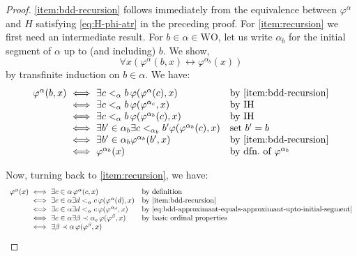 \documentclass[10pt,a4paper]{amsart}
\theoremstyle{plain}
\theoremstyle{definition}
\renewcommand{\phi}{\varphi}
\newcommand{\blue}[1]{{\color{blue}#1}}
\newcommand{\comment}[1]{\blue{#1}}
\newcommand{\anupam}[1]{\todo[color=green]{A: #1}}
\renewcommand{\todo}[1]{}
\renewcommand{\comment}[1]{}
\renewcommand{\anupam}[1]{}
\theoremstyle{plain}
\theoremstyle{definition} %
\newcommand{\liff}{\leftrightarrow}
\newcommand{\WO}{\mathrm{WO}}
\newcommand{\ordlneq}{\prec}
\begin{document}
\begin{proof}
    \ref{item:bdd-recursion} follows immediately from the equivalence between $\phi^\alpha$ and $H$ satisfying \eqref{eq:H-phi-atr} in the preceding proof. 
% 
    For \ref{item:recursion} we first need an intermediate result.
    For $b\in \alpha \in \WO$, let us write $\alpha_b$ for the initial segment of $\alpha$ up to (and including) $b$.
    We show,
    \begin{equation}
        \label{eq:bdd-approximant-equals-approximant-upto-initial-segment}
        \forall x (\phi^\alpha (b,x) \liff \phi^{\alpha_b}(x))
    \end{equation}
    by transfinite induction on $b\in \alpha$.\anupam{discuss induction on arithmetical combinations} 
    We have:
    \[
    \begin{array}{r@{\ \iff \ }ll}
         \phi^\alpha(b,x) & \exists c<_\alpha b\, \phi(\phi^\alpha(c),x) & \text{by \ref{item:bdd-recursion}}\\
         & \exists c<_\alpha b \, \phi (\phi^{\alpha_c},x) & \text{by IH} \\
         & \exists c<_\alpha b \, \phi (\phi^{\alpha_b}(c),x) & \text{by IH} \\
         & \exists b' \in \alpha_b \exists c <_{\alpha_b} b' \phi (\phi^{\alpha_b}(c),x) & \text{set $b'=b$} \\
         & \exists b' \in \alpha_b \phi^{\alpha_b}(b',x) & \text{by \ref{item:bdd-recursion}}\\
         & \phi^{\alpha_b}(x) &\text{by dfn.\ of $\phi^{\alpha_b}$}
    \end{array}
    \]

    Now, turning back to \ref{item:recursion}, we have:
    \[
    \begin{array}[b]{r@{\ \iff \ }ll}
         \phi^\alpha(x) & \exists c \in \alpha \, \phi^\alpha(c,x) & \text{by definition} \\
         & \exists c \in \alpha \exists d<_\alpha c\, \phi(\phi^\alpha(d),x) &\text{by \ref{item:bdd-recursion}} \\
         & \exists c \in \alpha \exists d<_\alpha c \, \phi(\phi^{\alpha_d},x) & \text{by \eqref{eq:bdd-approximant-equals-approximant-upto-initial-segment}} \\
         & \exists c \in \alpha \exists \beta \ordlneq \alpha_c \, \phi(\phi^\beta,x) & \text{by basic ordinal properties \comment{?}} \\
         & \exists \beta \ordlneq \alpha \, \phi(\phi^\beta,x) \tag*{\qed}
    \end{array}
    \]
    \anupam{in penultimate step, might need invariance of approximants under isomorphic ordinals.}
    \renewcommand{\qed}{}
\end{proof}
\end{document}
